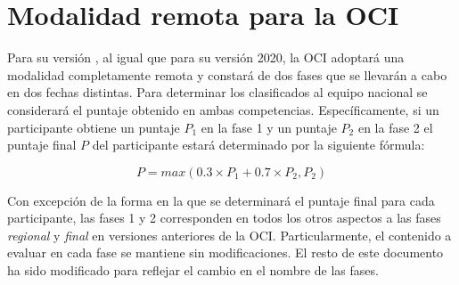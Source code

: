 \documentclass{article}
\newcommand{\new}{\color{red}}
\begin{document}
{\new
\section{Modalidad remota para la OCI \the\year}
Para su versión \the\year, al igual que para su versión 2020, la OCI adoptará una modalidad completamente remota
y constará de dos fases que se llevarán a cabo en dos fechas distintas.
Para determinar los clasificados al equipo nacional se considerará el puntaje obtenido en ambas
competencias.
Específicamente, si un participante obtiene un puntaje $P_1$ en la fase 1 y un puntaje
$P_2$ en la fase 2 el puntaje final $P$ del participante estará determinado por la siguiente fórmula:

$$
P = max(0.3\times P_1 + 0.7\times P_2, P_2)
$$

Con excepción de la forma en la que se determinará el puntaje final para cada participante, las fases
1 y 2 corresponden en todos los otros aspectos a las fases \emph{regional} y \emph{final} en versiones anteriores de la
OCI.
Particularmente, el contenido a evaluar en cada fase se mantiene sin modificaciones.
El resto de este documento ha sido modificado para reflejar el cambio en el nombre de las fases.
}
\end{document}
